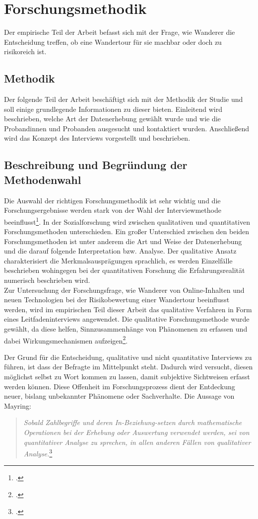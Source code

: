 \chapter{Forschungsmethodik}
\label{forschungsmethodik}

Der empirische Teil der Arbeit befasst sich mit der Frage, wie Wanderer die Entscheidung treffen, ob eine Wandertour für sie machbar oder doch zu risikoreich ist.

\section{Methodik}
\label{methodik}

Der folgende Teil der Arbeit beschäftigt sich mit der Methodik der Studie und soll einige grundlegende Informationen zu dieser bieten. Einleitend wird beschrieben, welche Art der Datenerhebung gewählt wurde und wie die Probandinnen und Probanden ausgesucht und kontaktiert wurden. Anschließend wird das Konzept des Interviews vorgestellt und beschrieben.

\section{Beschreibung und Begründung der Methodenwahl}
Die Auswahl der richtigen Forschungsmethodik ist sehr wichtig und die Forschungsergebnisse werden stark von der Wahl der Interviewmethode beeinflusst\footcite[S. 186]{kruse}. 
In der Sozialforschung wird zwischen qualitativen und quantitativen Forschungsmethoden unterschieden. Ein großer Unterschied zwischen den beiden Forschungsmethoden ist unter anderem die Art und Weise der Datenerhebung und die darauf folgende Interpretation bzw. Analyse. Der qualitative Ansatz charakterisiert die Merkmalsausprägungen sprachlich, es werden Einzelfälle beschrieben wohingegen bei der quantitativen Forschung die Erfahrungsrealität numerisch beschrieben wird.\\
Zur Untersuchung der Forschungsfrage, wie Wanderer von Online-Inhalten und neuen Technologien bei der Risikobewertung einer Wandertour beeinflusst werden, wird im empirischen Teil dieser Arbeit das qualitative Verfahren in Form eines Leitfadeninterviews angewendet. Die qualitative Forschungsmethode wurde gewählt, da diese helfen, Sinnzusammenhänge von Phänomenen zu erfassen und dabei Wirkungsmechanismen aufzeigen\footcite[S. 117-133]{przyborski}. 

Der Grund für die Entscheidung, qualitative und nicht quantitative Interviews zu führen, ist dass der Befragte im Mittelpunkt steht. Dadurch wird versucht, diesen möglichst selbst zu Wort kommen zu lassen, damit subjektive Sichtweisen erfasst werden können. Diese Offenheit im Forschungsprozess dient der Entdeckung neuer, bislang unbekannter Phänomene oder Sachverhalte. Die Aussage von Mayring:
\begin{quote}
	\textit{ {\glqq Sobald Zahlbegriffe und deren In-Beziehung-setzen durch mathematische Operationen bei der Erhebung oder Auswertung verwendet werden, sei von quantitativer Analyse zu sprechen, in allen anderen Fällen von qualitativer Analyse.\grqq}}\footcite[S. 17]{mayring}
\end{quote}

